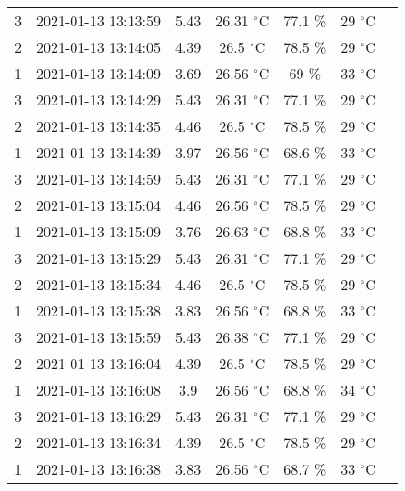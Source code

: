 \begin{itemize}
\begin{table}[H]
\begin{tabular}{ccccccc}
            		\midrule
            		  3 & 2021-01-13 13:13:59 & 5.43 & 26.31 $^{\circ}$C & 77.1 \% & 29 $^{\circ}$C  \\ 
                      2 & 2021-01-13 13:14:05 & 4.39 & 26.5 $^{\circ}$C & 78.5 \% & 29 $^{\circ}$C  \\  
                      1 & 2021-01-13 13:14:09 & 3.69 & 26.56 $^{\circ}$C & 69 \% & 33 $^{\circ}$C  \\  
                      3 & 2021-01-13 13:14:29 & 5.43 & 26.31 $^{\circ}$C & 77.1 \% & 29 $^{\circ}$C \\ 
                      2 & 2021-01-13 13:14:35 & 4.46 & 26.5 $^{\circ}$C & 78.5 \% & 29 $^{\circ}$C    \\ 
                      1 & 2021-01-13 13:14:39 & 3.97 & 26.56 $^{\circ}$C & 68.6 \% & 33 $^{\circ}$C   \\
                      3 & 2021-01-13 13:14:59 & 5.43 & 26.31 $^{\circ}$C & 77.1 \% & 29 $^{\circ}$C    \\
                      2 & 2021-01-13 13:15:04 & 4.46 & 26.56 $^{\circ}$C & 78.5 \% & 29 $^{\circ}$C  \\
                      1 & 2021-01-13 13:15:09 & 3.76 & 26.63 $^{\circ}$C & 68.8 \% & 33 $^{\circ}$C   \\ 
                      3 & 2021-01-13 13:15:29 &  5.43 & 26.31 $^{\circ}$C & 77.1 \% & 29 $^{\circ}$C    \\  
                     2 & 2021-01-13 13:15:34 &  4.46 & 26.5 $^{\circ}$C & 78.5 \%& 29 $^{\circ}$C    \\  
                     1 & 2021-01-13 13:15:38 &  3.83 & 26.56 $^{\circ}$C & 68.8 \%& 33 $^{\circ}$C  \\  
                     3 & 2021-01-13 13:15:59 &  5.43 & 26.38 $^{\circ}$C & 77.1 \%& 29 $^{\circ}$C  \\  
                     2 & 2021-01-13 13:16:04&  4.39 & 26.5 $^{\circ}$C & 78.5 \%& 29 $^{\circ}$C    \\  
                     1 & 2021-01-13 13:16:08&  3.9 & 26.56 $^{\circ}$C & 68.8 \%& 34 $^{\circ}$C    \\  
                     3 & 2021-01-13 13:16:29 &  5.43 & 26.31 $^{\circ}$C & 77.1 \%& 29 $^{\circ}$C  \\  
                     2 & 2021-01-13 13:16:34 &  4.39 & 26.5 $^{\circ}$C & 78.5 \%& 29 $^{\circ}$C   \\  
                     1 & 2021-01-13 13:16:38&  3.83 & 26.56 $^{\circ}$C & 68.7 \%& 33 $^{\circ}$C    \\  

\end{tabular}
\end{table}
\end{itemize}
